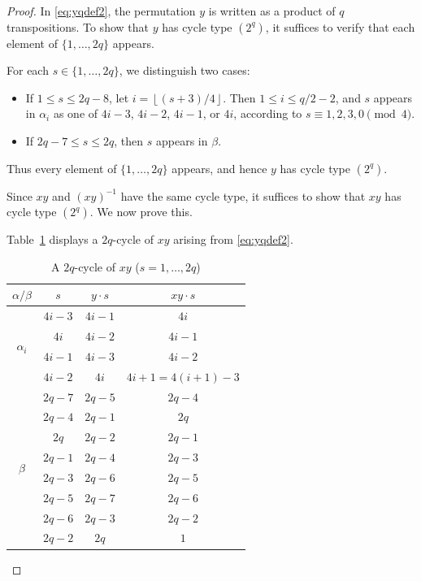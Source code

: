 \documentclass[12pt,reqno]{amsart}
\newcommand{\A}{\alpha}									%
\newcommand{\B}{\beta}									%
\newcommand{\HL}{\vspace{2mm}}							%
\newcommand{\fl}[1]{\left\lfloor #1 \right\rfloor}					%
\theoremstyle{mythmstyle}
\theoremstyle{mydefstyle}
\numberwithin{equation}{section}
\begin{document}
\begin{proof}
\item[\ref{itm:c2b2-1}]
In \eqref{eq:yqdef2}, the permutation $y$ is written as a product of $q$ transpositions.
To show that $y$ has cycle type $(2^{q})$, it suffices to verify that each element of $\{1,\ldots,2q\}$ appears.

For each $s \in \{1,\ldots,2q\}$, we distinguish two cases:
\begin{itemize}
\item If $1 \le s \le 2q-8$, let $i = \fl{(s+3)/4}$. Then $1 \le i \le q/2-2$, and $s$ appears in $\A_i$ as one of
$4i-3$, $4i-2$, $4i-1$, or $4i$, according to $s \equiv 1,2,3,0 \pmod{4}$.
\item If $2q-7 \le s \le 2q$, then $s$ appears in $\B$.
\end{itemize}

Thus every element of $\{1,\ldots,2q\}$ appears, and hence $y$ has cycle type $(2^{q})$.
\HL

\item[\ref{itm:c2b2-2}]
Since $xy$ and $(xy)^{-1}$ have the same cycle type, it suffices to show that $xy$ has cycle type $(2^{q})$.
We now prove this.

Table~\ref{tab:xycycles2} displays a $2q$-cycle of $xy$ arising from \eqref{eq:yqdef2}.

\begin{table}[htbp]
\centering
\small
\begin{tabular}{|c|c|c|c|}
\hline
$\A / \B$ & $s$ & $y\cdot s$ & $xy\cdot s$ \\
\hline
\multirow{4}{*}{$\A_{i}$} & $4i-3$ & $4i-1$ & $4i$ \\
& $4i$ & $4i-2$ & $4i-1$ \\
& $4i-1$ & $4i-3$ & $4i-2$ \\
& $4i-2$ & $4i$ & $4i+1=4(i+1)-3$ \\
\hline
\multirow{8}{*}{$\B$} & $2q-7$ & $2q-5$ & $2q-4$ \\
& $2q-4$ & $2q-1$ & $2q$ \\
& $2q$ & $2q-2$ & $2q-1$ \\
& $2q-1$ & $2q-4$ & $2q-3$ \\
& $2q-3$ & $2q-6$ & $2q-5$ \\
& $2q-5$ & $2q-7$ & $2q-6$ \\
& $2q-6$ & $2q-3$ & $2q-2$ \\
& $2q-2$ & $2q$ & $1$ \\
\hline
\end{tabular}
\vspace{1\baselineskip}
\caption{A $2q$-cycle of $xy$ ($s = 1, \ldots, 2q$)}\label{tab:xycycles2}
\end{table}


\end{proof}
\end{document}
